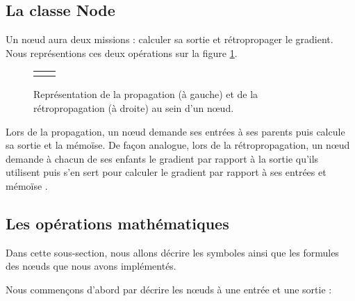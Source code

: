\subsection{La classe Node}

Un n\oe{}ud aura deux missions : calculer sa sortie et rétropropager le gradient. Nous représentions ces deux opérations sur la figure \ref{node}.

\begin{figure}
\begin{center}
\begin{tabular}{cc}
 &  \\
\end{tabular}
\end{center}
\caption{Représentation de la propagation (à gauche) et de la rétropropagation (à droite) au sein d'un n\oe{}ud.}
\label{node}
\end{figure}

Lors de la propagation, un n\oe{}ud demande ses entrées à ses parents puis calcule sa sortie et la mémoïse. De façon analogue, lors de la rétropropagation, un n\oe{}ud demande à chacun de ses enfants le gradient par rapport à la sortie qu'ils utilisent puis s'en sert pour calculer le gradient par rapport à ses entrées et mémoïse
.

\subsection{Les opérations mathématiques}

Dans cette sous-section, nous allons décrire les symboles ainsi que les formules des n\oe{}uds que nous avons implémentés. \label{nodes}

Nous commençons d'abord par décrire les n\oe{}uds à une entrée et une sortie :

